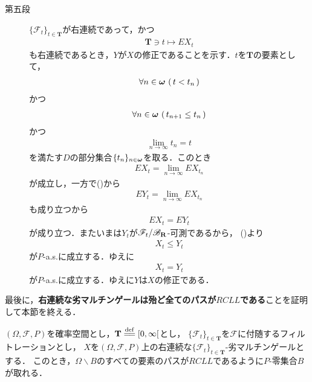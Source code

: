 \begin{sketch}
\begin{description}
			\item[第五段]
				$\{\mathscr{F}_t\}_{t \in \mathbf{T}}$が右連続であって，かつ
				\begin{align}
					\mathbf{T} \ni t \longmapsto EX_t
				\end{align}
				も右連続であるとき，$Y$が$X$の修正であることを示す．$t$を$\mathbf{T}$の要素として，
				\begin{align}
					\forall n \in {\boldsymbol \omega}\, \left(\, t < t_n\, \right)
				\end{align}
				かつ
				\begin{align}
					\forall n \in {\boldsymbol \omega}\, \left(\, t_{n+1} \leq t_n\, \right)
				\end{align}
				かつ
				\begin{align}
					\lim_{n \to \infty} t_n = t
				\end{align}
				を満たす$D$の部分集合$\{t_n\}_{n \in {\boldsymbol \omega}}$を取る．このとき
				\begin{align}
					EX_t = \lim_{n \to \infty} EX_{t_n}
				\end{align}
				が成立し，一方で()から
				\begin{align}
					EY_t = \lim_{n \to \infty} EX_{t_n}
				\end{align}
				も成り立つから
				\begin{align}
					EX_t = EY_t
				\end{align}
				が成り立つ．またいまは$Y_t$が$\mathscr{F}_t/\mathscr{B}_{\mathbf{R}}$-可測であるから，
				()より
				\begin{align}
					X_t \leq Y_t
				\end{align}
				が$P$-a.s.に成立する．ゆえに
				\begin{align}
					X_t = Y_t
				\end{align}
				が$P$-a.s.に成立する．ゆえに$Y$は$X$の修正である．
				\QED
		\end{description}
	\end{sketch}
	
	最後に，{\bf 右連続な劣マルチンゲールは殆ど全てのパスが$RCLL$である}ことを証明して本節を終える．
	
	\begin{screen}
		\begin{thm}[パスの正則性]\label{thm:regularity_of_paths_of_sub_martingales}
			$(\Omega,\mathscr{F},P)$を確率空間とし，$\mathbf{T} \defeq [0,\infty[$とし，
			$\{\mathscr{F}_t\}_{t \in \mathbf{T}}$を$\mathscr{F}$に付随するフィルトレーションとし，
			$X$を$(\Omega,\mathscr{F},P)$上の右連続な$\{\mathscr{F}_t\}_{t \in \mathbf{T}}$-劣マルチンゲールとする．
			このとき，$\Omega \backslash B$のすべての要素のパスが$RCLL$であるように$P$-零集合$B$が取れる．
		\end{thm}
	\end{screen}
	
